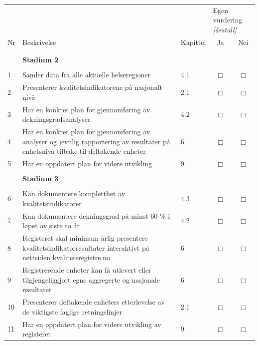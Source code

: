 \documentclass{article}
\newcommand{\sjekkboks}{
    \makebox[0pt][l]{$\square$}\raisebox{.15ex}{\hspace{0.1em}$\checkmark$}
}
\newcommand{\tomboks}{
    $\Box$
}
\begin{document}
    \begin{centering}
        \begin{longtable}{l p{} l c c}
        \hline \hline
        & & & \multicolumn{2}{l}{Egen vurdering \textit{[årstall]}} \\
        Nr & Beskrivelse & Kapittel & Ja & Nei \\
        & & & & \\
        \hline \hline
        & & & & \\
        & \textbf{Stadium 2} & & & \\
        & & & & \\
        1 & Samler data fra alle aktuelle helseregioner & 4.1 & \tomboks & \tomboks \\
        2 & Presenterer kvalitetsindikatorene på nasjonalt nivå & 2.1 & \tomboks & \tomboks \\
        3 & Har en konkret plan for gjennomføring av dekningsgradsanalyser  & 4.2 & \tomboks & \tomboks \\
        4 & Har en konkret plan for gjennomføring av analyser og jevnlig rapportering av resultater på enhetsnivå tilbake til deltakende enheter  & 6 & \tomboks & \tomboks \\
        5 & Har en oppdatert plan for videre utvikling  & 9 & \tomboks & \tomboks \\
        & & & & \\
        & \textbf{Stadium 3} & & & \\
        & & & & \\
        6 & Kan dokumentere kompletthet av kvalitetsindikatorer & 4.3 & \tomboks & \tomboks \\
        7 & Kan dokumentere dekningsgrad på minst 60 \% i løpet av siste to år & 4.2 & \tomboks & \tomboks \\
        8 & Registeret skal minimum årlig presentere kvalitetsindikatorresultater interaktivt på nettsiden kvalitetsregistre.no & 6 & \tomboks & \tomboks \\
        9 & Registrerende enheter kan få utlevert eller tilgjengeliggjort egne aggregerte og nasjonale resultater & 6 & \tomboks & \tomboks \\
        10 & Presenterer deltakende enheters etterlevelse av de viktigste faglige retningslinjer & 2.1 & \tomboks & \tomboks \\
        11 & Har en oppdatert plan for videre utvikling av registeret & 9 & \tomboks & \tomboks \\

\end{longtable}
\end{centering}
\end{document}

